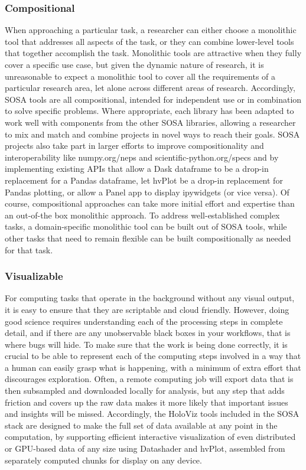 \subsubsection{Compositional}
When approaching a particular task, a researcher can either choose a monolithic tool that addresses all aspects of the task, or they can combine lower-level tools that together accomplish the task. Monolithic tools are attractive when they fully cover a specific use case, but given the dynamic nature of research, it is unreasonable to expect a monolithic tool to cover all the requirements of a particular research area, let alone across different areas of research. Accordingly, SOSA tools are all compositional, intended for independent use or in combination to solve specific problems. Where appropriate, each library has been adapted to work well with components from the other SOSA libraries, allowing a researcher to mix and match and combine projects in novel ways to reach their goals. SOSA projects also take part in larger efforts to improve compositionality and interoperability like numpy.org/neps and scientific-python.org/specs and by implementing existing APIs that allow a Dask dataframe to be a drop-in replacement for a Pandas dataframe, let hvPlot be a drop-in replacement for Pandas plotting, or allow a Panel app to display ipywidgets (or vice versa). Of course, compositional approaches can take more initial effort and expertise than an out-of-the box monolithic approach. To address well-established complex tasks, a domain-specific monolithic tool can be built out of SOSA tools, while other tasks that need to remain flexible can be built compositionally as needed for that task. 

\subsubsection{Visualizable}
For computing tasks that operate in the background without any visual output, it is easy to ensure that they are scriptable and cloud friendly. However, doing good science requires understanding each of the processing steps in complete detail, and if there are any unobservable black boxes in your workflows, that is where bugs will hide. To make sure that the work is being done correctly, it is crucial to be able to represent each of the computing steps involved in a way that a human can easily grasp what is happening, with a minimum of extra effort that discourages exploration. Often, a remote computing job will export data that is then subsampled and downloaded locally for analysis, but any step that adds friction and covers up the raw data makes it more likely that important issues and insights will be missed. Accordingly, the HoloViz tools included in the SOSA stack are designed to make the full set of data available at any point in the computation, by supporting efficient interactive visualization of even distributed or GPU-based data of any size using Datashader and hvPlot, assembled from separately computed chunks for display on any device.


